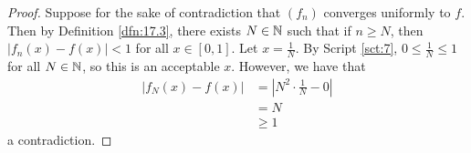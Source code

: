 \documentclass[../main.tex]{subfiles}
\begin{document}
\begin{exercise}
\begin{enumerate}[label={(\alph*)}]
\begin{proof}
            Suppose for the sake of contradiction that $(f_n)$ converges uniformly to $f$. Then by Definition \ref{dfn:17.3}, there exists $N\in\mathbb{N}$ such that if $n\geq N$, then $|f_n(x)-f(x)|<1$ for all $x\in[0,1]$. Let $x=\frac{1}{N}$. By Script \ref{sct:7}, $0\leq\frac{1}{N}\leq 1$ for all $N\in\mathbb{N}$, so this is an acceptable $x$. However, we have that
            \begin{align*}
                |f_N(x)-f(x)| &= |N^2\cdot\frac{1}{N}-0|\\
                &= N\\
                &\geq 1
            \end{align*}
            a contradiction.
        \end{proof}
    \end{enumerate}
\end{exercise}
\end{document}
